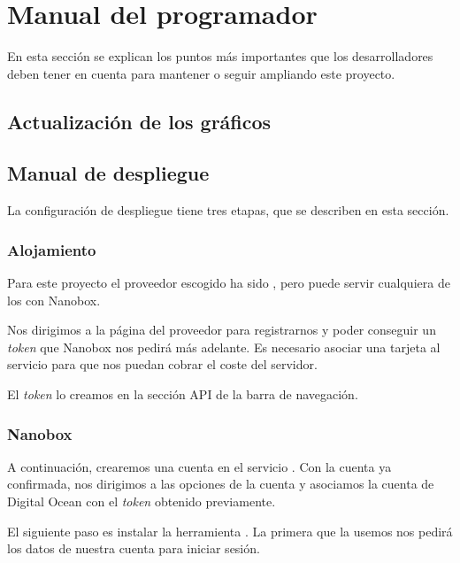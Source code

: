 \section{Manual del programador}

En esta sección se explican los puntos más importantes que los desarrolladores 
deben tener en cuenta para mantener o seguir ampliando este proyecto.

\subsection{Actualización de los gráficos}



\subsection{Manual de despliegue}

La configuración de despliegue tiene tres etapas, que se describen en esta 
sección.

\subsubsection{Alojamiento}

Para este proyecto el proveedor escogido ha sido 
, pero puede servir 
cualquiera de los 
 con Nanobox.

Nos dirigimos a la página del proveedor para registrarnos y poder conseguir un 
\textit{token} que Nanobox nos pedirá más adelante. Es necesario asociar una 
tarjeta al servicio para que nos puedan cobrar el coste del servidor.

El \textit{token} lo creamos en la sección API de la barra de navegación.

\subsubsection{Nanobox}

A continuación, crearemos una cuenta en el servicio . Con la cuenta ya confirmada, nos dirigimos a las 
opciones de la cuenta y asociamos la cuenta de Digital Ocean con el 
\textit{token} obtenido previamente.

El siguiente paso es instalar la herramienta 
. La primera que la 
usemos nos pedirá los datos de nuestra cuenta para iniciar sesión.

